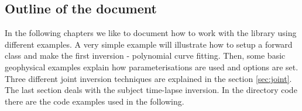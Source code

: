 \subsection{Outline of the document}\label{sec:overview}
In the following chapters we like to document how to work with the library using different examples.
A very simple example will illustrate how to setup a forward class and make the first inversion - polynomial curve fitting.
Then, some basic geophysical examples explain how parameterisations are used and options are set.
Three different joint inversion techniques are explained in the section \ref{sec:joint}.
The last section deals with the subject time-lapse inversion.
In the directory code there are the code examples used in the following.
